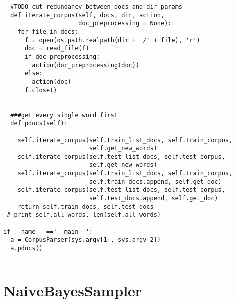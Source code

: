 \begin{lstlisting}
  #TODO cut redundancy between docs and dir params
  def iterate_corpus(self, docs, dir, action, 
                     doc_preprocessing = None):
    for file in docs:
      f = open(os.path.realpath(dir + '/' + file), 'r')
      doc = read_file(f)
      if doc_preprocessing:
        action(doc_preprocessing(doc))
      else:
        action(doc)
      f.close()


  ###get every single word first
  def pdocs(self):

    self.iterate_corpus(self.train_list_docs, self.train_corpus, 
                        self.get_new_words)
    self.iterate_corpus(self.test_list_docs, self.test_corpus, 
                        self.get_new_words)
    self.iterate_corpus(self.train_list_docs, self.train_corpus, 
                        self.train_docs.append, self.get_doc)
    self.iterate_corpus(self.test_list_docs, self.test_corpus, 
                        self.test_docs.append, self.get_doc)
    return self.train_docs, self.test_docs
 # print self.all_words, len(self.all_words)

if __name__ =='__main__':
  a = CorpusParser(sys.argv[1], sys.argv[2])
  a.pdocs()


\end{lstlisting}

\section{NaiveBayesSampler}

